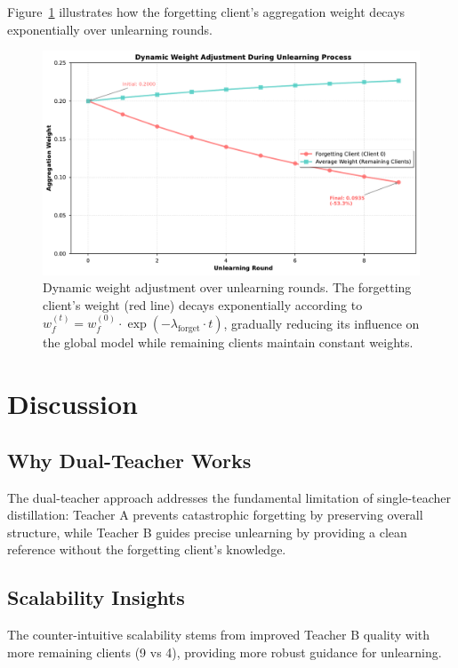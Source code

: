 \documentclass[10pt,twocolumn]{article}
\begin{document}
Figure~\ref{fig:weights} illustrates how the forgetting client's aggregation weight decays exponentially over unlearning rounds.

\begin{figure}[htbp]
\centering
\includegraphics[width=\columnwidth]{figures/figure4_dynamic_weights.pdf}
\caption{Dynamic weight adjustment over unlearning rounds. The forgetting client's weight (red line) decays exponentially according to $w_f^{(t)} = w_f^{(0)} \cdot \exp(-\lambda_{\text{forget}} \cdot t)$, gradually reducing its influence on the global model while remaining clients maintain constant weights.}
\label{fig:weights}
\end{figure}

\section{Discussion}

\subsection{Why Dual-Teacher Works}

The dual-teacher approach addresses the fundamental limitation of single-teacher distillation: Teacher A prevents catastrophic forgetting by preserving overall structure, while Teacher B guides precise unlearning by providing a clean reference without the forgetting client's knowledge.

\subsection{Scalability Insights}

The counter-intuitive scalability stems from improved Teacher B quality with more remaining clients (9 vs 4), providing more robust guidance for unlearning.
\end{document}
